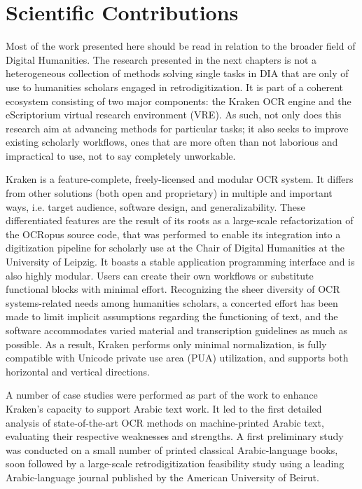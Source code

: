 \section{Scientific Contributions}

Most of the work presented here should be read in relation to the broader field
of Digital Humanities. The research presented in the next chapters is not a
heterogeneous collection of methods solving single tasks in DIA that are only
of use to humanities scholars engaged in retrodigitization. It is part of a
coherent ecosystem consisting of two major components: the Kraken OCR engine
and the eScriptorium virtual research environment (VRE). As such, not only does
this research aim at advancing methods for particular tasks; it also seeks to
improve existing scholarly workflows, ones that are more often than not
laborious and impractical to use, not to say completely unworkable.

Kraken is a feature-complete, freely-licensed and modular OCR system. It
differs from other solutions (both open and proprietary) in multiple and
important ways, i.e. target audience, software design, and generalizability.
These differentiated features are the result of its roots as a large-scale
refactorization of the OCRopus source code, that was performed to enable its
integration into a digitization pipeline for scholarly use at the Chair of
Digital Humanities at the University of Leipzig. It boasts a stable application
programming interface and is also highly modular. Users can create their own
workflows or substitute functional blocks with minimal effort. Recognizing the
sheer diversity of OCR systems-related needs among humanities scholars, a
concerted effort has been made to limit implicit assumptions regarding the
functioning of text, and the software accommodates varied material and
transcription guidelines as much as possible. As a result, Kraken performs only
minimal normalization, is fully compatible with Unicode private use area (PUA)
utilization, and supports both horizontal and vertical directions.

A number of case studies were performed as part of the work to enhance Kraken’s
capacity to support Arabic text work. It led to the first detailed analysis of
state-of-the-art OCR methods on machine-printed Arabic text, evaluating their
respective weaknesses and strengths. A first preliminary study was conducted on
a small number of printed classical Arabic-language books, soon followed by a
large-scale retrodigitization feasibility study using a leading Arabic-language
journal published by the American University of Beirut.

